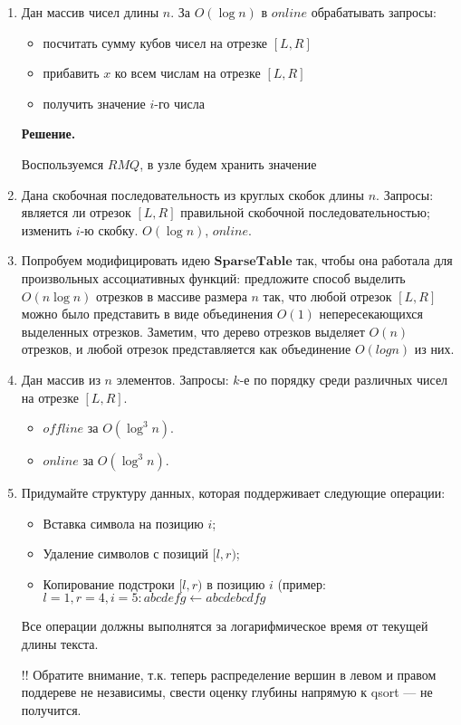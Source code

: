 \begin{enumerate}
	\item Дан массив чисел длины $n$. За $O(\log n)$ в $online$ обрабатывать запросы:
	\begin{itemize}
		\item посчитать сумму кубов чисел на отрезке $[L, R]$
		\item прибавить $x$ ко всем числам на отрезке $[L, R]$
		\item получить значение $i$-го числа
	\end{itemize}
	
	\textbf{Решение.}
	
	Воспользуемся $RMQ$, в узле будем хранить значение 
	
	\item Дана скобочная последовательность из круглых скобок длины $n$. Запросы: является ли 
	отрезок $[L, R]$ правильной скобочной последовательностью; изменить $i$-ю скобку. $O(\log n)$, $online$.
	
	\item Попробуем модифицировать идею $\mathbf{SparseTable}$ так, чтобы она работала для 
	произвольных ассоциативных функций: предложите способ выделить $O(n \log n)$ отрезков в 
	массиве размера $n$ так, что любой отрезок $[L, R]$ можно было представить в виде 
	объединения $O(1)$ непересекающихся выделенных отрезков. Заметим, что дерево отрезков 
	выделяет $O(n)$ отрезков, и любой отрезок представляется как объединение $O(log n)$ из них.
	
	\item Дан массив из $n$ элементов. Запросы: $k$-е по порядку среди различных чисел на отрезке $[L, R]$.
	\begin{itemize}
		\item $offline$ за $O(\log^3 n)$.
		\item $online$ за $O(\log^3 n)$.
	\end{itemize}
	
	\item Придумайте структуру данных, которая поддерживает следующие операции:
	
	\begin{itemize}
		\item Вставка символа на позицию $i$;
		\item Удаление символов с позиций $[l, r)$;
		\item Копирование подстроки $[l, r)$ в позицию $i$ (пример: $l = 1, r = 4, i = 5 : abcdefg \leftarrow abcdebcdfg$
	\end{itemize}
	
	Все операции должны выполнятся за логарифмическое время от текущей длины текста.
		
	!! Обратите внимание, т.к. теперь распределение вершин в левом и правом поддереве не 
	независимы, свести оценку глубины напрямую к qsort — не получится.
		
\end{enumerate}


